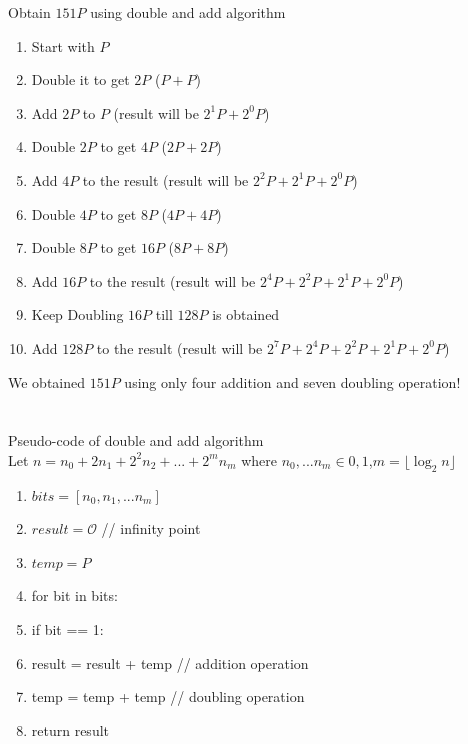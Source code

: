 \documentclass[12pt,a4paper]{report}
\begin{document}
Obtain $151P$ using double and add algorithm
\begin{enumerate}
	\item Start with $P$
	\item Double it to get $2P$ ($P+P$)
	\item Add $2P$ to $P$ (result will be $2^1P+2^0P$)
	\item Double $2P$ to get $4P$ ($2P+2P$)
	\item Add $4P$ to the result (result will be $2^2P+2^1P+2^0P$)
	\item Double $4P$ to get $8P$ ($4P+4P$)
	\item Double $8P$ to get $16P$ ($8P+8P$)
	\item Add $16P$ to the result (result will be $2^4P+2^2P+2^1P+2^0P$)
	\item Keep Doubling $16P$ till $128P$ is obtained
	\item Add $128P$ to the result (result will be $2^7P+2^4P+2^2P+2^1P+2^0P$)
\end{enumerate}
We obtained $151P$ using only four addition and seven doubling operation!\\\\\\
Pseudo-code of double and add algorithm\\
Let $n=n_0+2n_1+2^2n_2+...+2^mn_m$ where $n_0,...n_m \in {0,1}$,$m =\lfloor \log_2 {n} \rfloor$
\begin{enumerate}
	\item $bits = [n_0,n_1,...n_m]$
	\item $result=\mathscr{O}$ \hspace{10mm} //  infinity point
	\item $temp=P$
	\item for bit in bits:
	\item \hspace{10mm}  if bit == 1:
	\item \hspace{10mm} \hspace{10mm}  result = result + temp \hspace{10mm} // addition operation
	\item \hspace{10mm} temp = temp + temp \hspace{10mm}  // doubling operation
	\item return result
\end{enumerate}
\cleardoublepage
\end{document}
